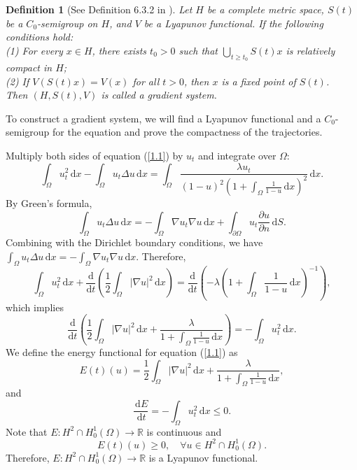 \documentclass{article}
\numberwithin{equation}{section}
\newtheorem{definition}{Definition}[section]
\begin{document}
\begin{definition}[See Definition 6.3.2 in \cite{ref8}]
    Let $H$ be a complete metric space, $S(t)$ be a $C_0$-semigroup on $H$, and $V$ be a Lyapunov functional. If the following conditions hold:\\
    (1) For every $x\in H$, there exists $t_0>0$ such that $\bigcup_{t\ge t_0}S(t)x$ is relatively compact in $H$;\\
    (2) If $V(S(t)x)=V(x)$ for all $t>0$, then $x$ is a fixed point of $S(t)$.\\
    Then $(H,S(t),V)$ is called a gradient system.
\end{definition}

To construct a gradient system, we will find a Lyapunov functional and a $C_0$-semigroup for the equation and prove the compactness of the trajectories.

Multiply both sides of equation (\ref{1.1}) by $u_t$ and integrate over $\Omega$:
$$\int_{\Omega}u_{t}^{2}\,\mathrm{d}x-\int_{\Omega}u_t\Delta u\,\mathrm{d}x = \int_{\Omega}\frac{\lambda u_t}{(1-u)^2(1+\int_{\Omega}\frac{1}{1-u}\,\mathrm{d}x)^2}\,\mathrm{d}x.$$
By Green's formula,
$$\int_{\Omega}u_t\Delta u\,\mathrm{d}x = -\int_{\Omega}\nabla u_t\nabla u\,\mathrm{d}x +\int_{\partial \Omega}u_t\frac{\partial u}{\partial n}\,\mathrm{d}S.$$
Combining with the Dirichlet boundary conditions, we have $\int_{\Omega}u_t\Delta u\,\mathrm{d}x = -\int_{\Omega}\nabla u_t\nabla u\,\mathrm{d}x$. Therefore,
$$\int_{\Omega}u_{t}^2\,\mathrm{d}x+\frac{\mathrm{d}}{\mathrm{d}t}\left(\frac{1}{2}\int_{\Omega}|\nabla u|^2\,\mathrm{d}x\right)=\frac{\mathrm{d}}{\mathrm{d}t}\left(-\lambda\left(1+\int_{\Omega}\frac{1}{1-u}\,\mathrm{d}x\right)^{-1}\right),$$
which implies
$$\frac{\mathrm{d}}{\mathrm{d}t}\left(\frac{1}{2}\int_{\Omega}|\nabla u|^2\,\mathrm{d}x+\frac{\lambda}{1+\int_{\Omega}\frac{1}{1-u}\,\mathrm{d}x}\right)=-\int_{\Omega}u_{t}^2\,\mathrm{d}x.$$
We define the energy functional for equation (\ref{1.1}) as
\begin{equation}
  E(t)(u)=\frac{1}{2}\int_{\Omega}|\nabla u|^2\,\mathrm{d}x+\frac{\lambda}{1+\int_{\Omega}\frac{1}{1-u}\,\mathrm{d}x}, \label{2.1}
\end{equation}
and
\begin{equation}
  \frac{\,\mathrm{d}E}{\,\mathrm{d}t}=-\int_{\Omega}u_{t}^2\,\mathrm{d}x\le 0.\label{2.2}
\end{equation}
Note that $E:H^2\cap H_0^1(\Omega)\to\mathbb{R}$ is continuous and
$$E(t)(u)\ge 0,\quad \forall u\in H^2\cap H_0^1(\Omega).$$
Therefore, $E:H^2\cap H_0^1(\Omega)\to\mathbb{R}$ is a Lyapunov functional.
\end{document}
